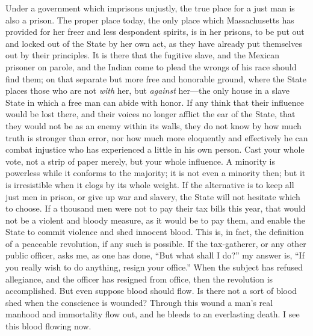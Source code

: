 \documentclass[12pt]{article}
\begin{document}
Under a government which imprisons unjustly, the true place for a just
man is also a prison. The proper place today, the only place which
Massachusetts has provided for her freer and less despondent spirits, is
in her prisons, to be put out and locked out of the State by her own
act, as they have already put themselves out by their principles. It is
there that the fugitive slave, and the Mexican prisoner on parole, and
the Indian come to plead the wrongs of his race should find them; on
that separate but more free and honorable ground, where the State places
those who are not \emph{with} her, but \emph{against} her---the only
house in a slave State in which a free man can abide with honor. If any
think that their influence would be lost there, and their voices no
longer afflict the ear of the State, that they would not be as an enemy
within its walls, they do not know by how much truth is stronger than
error, nor how much more eloquently and effectively he can combat
injustice who has experienced a little in his own person. Cast your
whole vote, not a strip of paper merely, but your whole influence. A
minority is powerless while it conforms to the majority; it is not even
a minority then; but it is irresistible when it clogs by its whole
weight. If the alternative is to keep all just men in prison, or give up
war and slavery, the State will not hesitate which to choose. If a
thousand men were not to pay their tax bills this year, that would not
be a violent and bloody measure, as it would be to pay them, and enable
the State to commit violence and shed innocent blood. This is, in fact,
the definition of a peaceable revolution, if any such is possible. If
the tax-gatherer, or any other public officer, asks me, as one has done,
``But what shall I do?'' my answer is, ``If you really wish to do
anything, resign your office.'' When the subject has refused allegiance,
and the officer has resigned from office, then the revolution is
accomplished. But even suppose blood should flow. Is there not a sort of
blood shed when the conscience is wounded? Through this wound a man's
real manhood and immortality flow out, and he bleeds to an everlasting
death. I see this blood flowing now.
\end{document}
